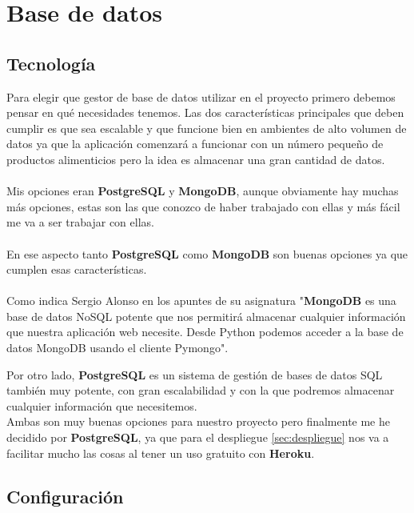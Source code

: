 \section{Base de datos} \label{sec:base_datos}

\subsection{Tecnología}

Para elegir que gestor de base de datos utilizar en el proyecto primero debemos pensar en qué necesidades tenemos.
Las dos características principales que deben cumplir es que sea escalable y que funcione bien en ambientes de alto volumen 
de datos ya que la aplicación comenzará a funcionar con un número pequeño de productos alimenticios pero la idea es almacenar una gran cantidad de datos.\\ \\
Mis opciones eran \textbf{PostgreSQL} y \textbf{MongoDB}, aunque obviamente hay muchas más opciones, estas son las que conozco de haber trabajado con ellas y
más fácil me va a ser trabajar con ellas.\\ \\

En ese aspecto tanto \textbf{PostgreSQL} como \textbf{MongoDB} son buenas opciones ya que cumplen esas características.\\ \\

Como indica Sergio Alonso en los apuntes de su asignatura \cite{NoSQL} "\textbf{MongoDB} es una base de datos NoSQL potente que nos permitirá almacenar cualquier información que nuestra aplicación web necesite. Desde Python podemos acceder a la base de datos MongoDB usando el cliente Pymongo".

Por otro lado, \textbf{PostgreSQL} es un sistema de gestión de bases de datos SQL también muy potente, con gran escalabilidad y con la que podremos almacenar cualquier información que necesitemos.\\

Ambas son muy buenas opciones para nuestro proyecto pero finalmente me he decidido por \textbf{PostgreSQL}, ya que para el despliegue \ref*{sec:despliegue} nos va a facilitar mucho las cosas
al tener un uso gratuito con \textbf{Heroku}.

\subsection{Configuración}

